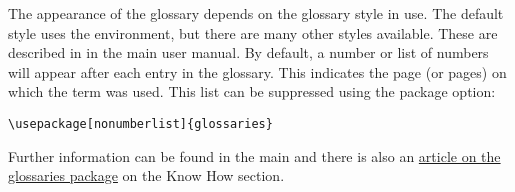 \documentclass{nlctdoc}
\begin{document}
The appearance of the glossary depends on the glossary style in
use. The default style uses the  environment, 
but there are many other styles available. These are described
in 
in the main  user manual.
By default, a number or list of numbers will appear after each entry 
in the glossary. This indicates the page (or pages)
on which the term was used. This list can be suppressed using
the  package option:
\begin{verbatim}
\usepackage[nonumberlist]{glossaries}
\end{verbatim}

Further information can be found in the main 
and there is also an
\href{http://www.latex-community.org/index.php?option=com_content&view=article&id=263:glossaries-nomenclature-lists-of-symbols-and-acronyms&catid=55:latex-general&Itemid=114}{article on the glossaries package}
on the 
Know How section.
\end{document}
